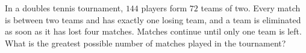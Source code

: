 In a doubles tennis tournament, $144$ players form $72$ teams of two. Every match is between two teams and has exactly one losing team, and a team is eliminated as soon as it has lost four matches. Matches continue until only one team is left. What is the greatest possible number of matches played in the tournament?
